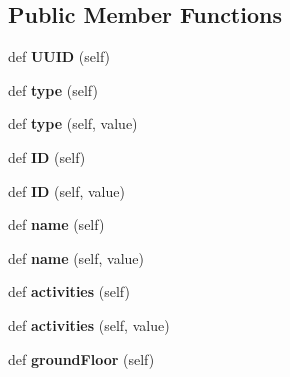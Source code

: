 \subsection*{Public Member Functions}
\begin{DoxyCompactItemize}
\item 
\mbox{\label{class_c_zone_1_1_c_zone_abbcfc1a774079da020e49c42cbadb693}} 
def {\bfseries U\+U\+ID} (self)
\item 
\mbox{\label{class_c_zone_1_1_c_zone_aff464267544e4efc9b770c8320c8f199}} 
def {\bfseries type} (self)
\item 
\mbox{\label{class_c_zone_1_1_c_zone_aca033702f187894894d3102de41d6b99}} 
def {\bfseries type} (self, value)
\item 
\mbox{\label{class_c_zone_1_1_c_zone_adb8818239148d2e5c5833a2b062ee9ad}} 
def {\bfseries ID} (self)
\item 
\mbox{\label{class_c_zone_1_1_c_zone_a0a178fbcae3f6431733dd63ee37ac7bb}} 
def {\bfseries ID} (self, value)
\item 
\mbox{\label{class_c_zone_1_1_c_zone_a5907ca3bbf8e7cd8f40c3007338f6d02}} 
def {\bfseries name} (self)
\item 
\mbox{\label{class_c_zone_1_1_c_zone_a62d212fdcbbcee30e90a64ce349d32f8}} 
def {\bfseries name} (self, value)
\item 
\mbox{\label{class_c_zone_1_1_c_zone_ae74a168e4a0b35119d7e38ba6fa12fd7}} 
def {\bfseries activities} (self)
\item 
\mbox{\label{class_c_zone_1_1_c_zone_ace542f219ac250dd15be04c2a610f031}} 
def {\bfseries activities} (self, value)
\item 
\mbox{\label{class_c_zone_1_1_c_zone_a9d0a5ea0a19a2297c8c9947ba979c976}} 
def {\bfseries ground\+Floor} (self)
\item 
\mbox{\label{class_c_zone_1_1_c_zone_af46a0905d14fd5a6d6da9689d4f02b4c}} 

\end{DoxyCompactItemize}
